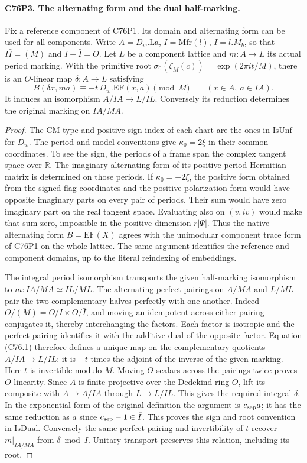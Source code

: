 \paragraph{C76P3. The alternating form and the dual half-marking.}
Fix a reference component of C76P1. Its domain and alternating form
can be used for all components. Write $A=D_w.\mathrm{La}$,
$I=\mathrm{Mfr}(l)$, $\bar I=l.M_b$, so that $I\bar I=(M)$
and $I+\bar I=O$. Let $L$ be a component lattice and
$m:A\to L$ its actual period marking. With the primitive root
$\sigma_0(\zeta_M(c))=\exp(2\pi i t/M)$, there is an
$O$-linear map $\delta:A\to L$ satisfying
\[
  B(\delta x,m a)\equiv -t\,D_w.\mathrm{EF}(x,a)\pmod M
         \qquad(x\in A,\ a\in IA).                         \tag{C76.1}
\]
It induces an isomorphism $A/IA\to L/IL$. Conversely its reduction
determines the original marking on $IA/MA$.

\begin{proof}
The CM type and positive-sign index of each chart are the ones in
$\mathrm{IsUnf}$ for $D_w$. The period and model conventions give
$\kappa_0=2\xi$ in their common coordinates. To see the sign, the
periods of a frame span the complex tangent space over $\mathbb R$.
The imaginary alternating form of its positive period Hermitian
matrix is determined on those periods. If $\kappa_0=-2\xi$,
the positive form obtained from the signed flag coordinates and the
positive polarization form would have opposite imaginary parts on
every pair of periods. Their sum would have zero imaginary part
on the real tangent space. Evaluating also on $(v,iv)$ would make
that sum zero, impossible in the positive dimension $r|\Psi|$.
Thus the native alternating form $B=\mathrm{EF}(X)$ agrees with
the unimodular component trace form of C76P1 on the whole lattice.
The same argument identifies the reference and component domains,
up to the literal reindexing of embeddings.

The integral period isomorphism transports the given half-marking
isomorphism to $m:IA/MA\simeq IL/ML$. The alternating perfect
pairings on $A/MA$ and $L/ML$ pair the two complementary halves
perfectly with one another. Indeed $O/(M)=O/I\times O/\bar I$,
and moving an idempotent across either pairing conjugates it, thereby
interchanging the factors. Each factor is isotropic and the perfect
pairing identifies it with the additive dual of the opposite factor.
Equation (C76.1) therefore defines a unique map on the complementary
quotients $A/IA\to L/IL$: it is $-t$ times the adjoint of the
inverse of the given marking. Here $t$ is invertible modulo $M$.
Moving $O$-scalars across the pairings twice proves $O$-linearity.
Since $A$ is finite projective over the Dedekind ring $O$, lift its
composite with $A\to A/IA$ through $L\to L/IL$. This gives the
required integral $\delta$. In the exponential form of the original
definition the argument is $c_{\rm sep}a$; it has the same reduction
as $a$ since $c_{\rm sep}-1\in\bar I$. This proves the sign and
root convention in $\mathrm{IsDual}$. Conversely the same perfect
pairing and invertibility of $t$ recover $m|_{IA/MA}$ from
$\delta\bmod I$. Unitary transport preserves this relation,
including its root.
\end{proof}

